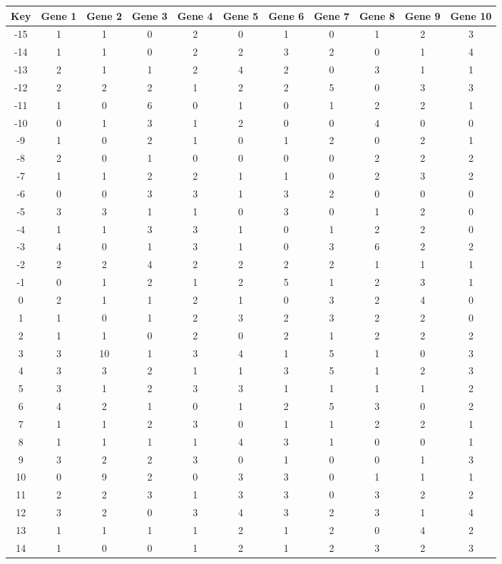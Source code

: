 \begin{tabular}{|c|c|c|c|c|c|c|c|c|c|c|}
\hline
Key & Gene 1 & Gene 2 & Gene 3 & Gene 4 & Gene 5 & Gene 6 & Gene 7 & Gene 8 & Gene 9 & Gene 10 \\
\hline
-15 & 1 & 1 & 0 & 2 & 0 & 1 & 0 & 1 & 2 & 3 \\
-14 & 1 & 1 & 0 & 2 & 2 & 3 & 2 & 0 & 1 & 4 \\
-13 & 2 & 1 & 1 & 2 & 4 & 2 & 0 & 3 & 1 & 1 \\
-12 & 2 & 2 & 2 & 1 & 2 & 2 & 5 & 0 & 3 & 3 \\
-11 & 1 & 0 & 6 & 0 & 1 & 0 & 1 & 2 & 2 & 1 \\
-10 & 0 & 1 & 3 & 1 & 2 & 0 & 0 & 4 & 0 & 0 \\
-9 & 1 & 0 & 2 & 1 & 0 & 1 & 2 & 0 & 2 & 1 \\
-8 & 2 & 0 & 1 & 0 & 0 & 0 & 0 & 2 & 2 & 2 \\
-7 & 1 & 1 & 2 & 2 & 1 & 1 & 0 & 2 & 3 & 2 \\
-6 & 0 & 0 & 3 & 3 & 1 & 3 & 2 & 0 & 0 & 0 \\
-5 & 3 & 3 & 1 & 1 & 0 & 3 & 0 & 1 & 2 & 0 \\
-4 & 1 & 1 & 3 & 3 & 1 & 0 & 1 & 2 & 2 & 0 \\
-3 & 4 & 0 & 1 & 3 & 1 & 0 & 3 & 6 & 2 & 2 \\
-2 & 2 & 2 & 4 & 2 & 2 & 2 & 2 & 1 & 1 & 1 \\
-1 & 0 & 1 & 2 & 1 & 2 & 5 & 1 & 2 & 3 & 1 \\
0 & 2 & 1 & 1 & 2 & 1 & 0 & 3 & 2 & 4 & 0 \\
1 & 1 & 0 & 1 & 2 & 3 & 2 & 3 & 2 & 2 & 0 \\
2 & 1 & 1 & 0 & 2 & 0 & 2 & 1 & 2 & 2 & 2 \\
3 & 3 & 10 & 1 & 3 & 4 & 1 & 5 & 1 & 0 & 3 \\
4 & 3 & 3 & 2 & 1 & 1 & 3 & 5 & 1 & 2 & 3 \\
5 & 3 & 1 & 2 & 3 & 3 & 1 & 1 & 1 & 1 & 2 \\
6 & 4 & 2 & 1 & 0 & 1 & 2 & 5 & 3 & 0 & 2 \\
7 & 1 & 1 & 2 & 3 & 0 & 1 & 1 & 2 & 2 & 1 \\
8 & 1 & 1 & 1 & 1 & 4 & 3 & 1 & 0 & 0 & 1 \\
9 & 3 & 2 & 2 & 3 & 0 & 1 & 0 & 0 & 1 & 3 \\
10 & 0 & 9 & 2 & 0 & 3 & 3 & 0 & 1 & 1 & 1 \\
11 & 2 & 2 & 3 & 1 & 3 & 3 & 0 & 3 & 2 & 2 \\
12 & 3 & 2 & 0 & 3 & 4 & 3 & 2 & 3 & 1 & 4 \\
13 & 1 & 1 & 1 & 1 & 2 & 1 & 2 & 0 & 4 & 2 \\
14 & 1 & 0 & 0 & 1 & 2 & 1 & 2 & 3 & 2 & 3 \\
\hline
\end{tabular}